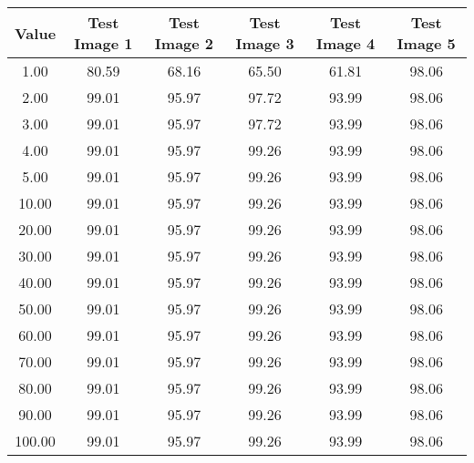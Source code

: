 \begin{tabular}{|c|c|c|c|c|c|}
\hline
\textbf{Value}&\textbf{Test Image 1}&\textbf{Test Image 2}&\textbf{Test Image 3}&\textbf{Test Image 4}&\textbf{Test Image 5}\\\hline
1.00&80.59&68.16&65.50&61.81&98.06\\\hline
2.00&99.01&95.97&97.72&93.99&98.06\\\hline
3.00&99.01&95.97&97.72&93.99&98.06\\\hline
4.00&99.01&95.97&99.26&93.99&98.06\\\hline
5.00&99.01&95.97&99.26&93.99&98.06\\\hline
10.00&99.01&95.97&99.26&93.99&98.06\\\hline
20.00&99.01&95.97&99.26&93.99&98.06\\\hline
30.00&99.01&95.97&99.26&93.99&98.06\\\hline
40.00&99.01&95.97&99.26&93.99&98.06\\\hline
50.00&99.01&95.97&99.26&93.99&98.06\\\hline
60.00&99.01&95.97&99.26&93.99&98.06\\\hline
70.00&99.01&95.97&99.26&93.99&98.06\\\hline
80.00&99.01&95.97&99.26&93.99&98.06\\\hline
90.00&99.01&95.97&99.26&93.99&98.06\\\hline
100.00&99.01&95.97&99.26&93.99&98.06\\\hline
\end{tabular}

